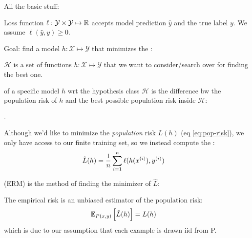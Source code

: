 \documentclass[11pt]{article}
\begin{document}
\dosecttoc
\tableofcontents




\label{Lectures}


All the basic stuff:
\begin{compactitem}
	\item Loss function $\ell: \mathcal Y \times \mathcal Y \mapsto \R$ accepts model prediction $\hat y$ and the true label $y$. We assume $\ell(\hat y, y) \geq 0$. 

	\item Goal: find a model $h: \mathcal X \mapsto \mathcal Y$ that minimizes the :

	\item {} $\mathcal H$ is a set of functions $h: \mathcal X \mapsto \mathcal Y$ that we want to consider/search over for finding the best one. 
	
	\item {} of a specific model $h$ wrt the hypothesis class $\mathcal H$ is the difference bw the population risk of $h$ and the best possible population risk inside $\mathcal H$:
\end{compactitem}

 . 
\begin{compactitem}
	\item Although we'd like to minimize the \textit{population} risk $L(h)$ (eq \ref{eq:pop-risk}), we only have access to our finite training set, so we instead compute the :
	\begin{align}
			\hat L(h) &= \inv{n} \insum \ell(h(\ival[i]{x}), \ival[i]{y})
	\end{align}

	\item {} (ERM) is the method of finding the minimizer of $\hat L$:

	\item The empirical risk is an unbiased estimator of the population risk:
	\begin{align}
			\E[P(x, y)]{\hat L(h)} &= L(h)
	\end{align}
	which is due to our assumption that each example is drawn iid from P. 
\end{compactitem}
\end{document}
